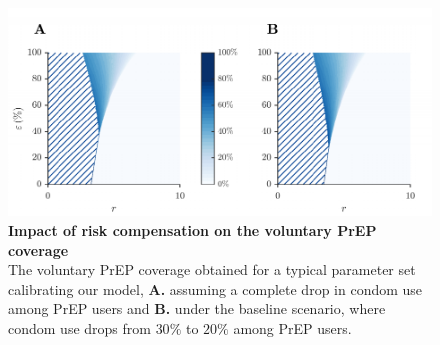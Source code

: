 \documentclass[12pt]{article}
\begin{document}
\newpage
\begin{figure}[H]
	\centering	
	\includegraphics{Figures/Fig_S5}
	\caption[Impact of risk compensation on the voluntary PrEP coverage]{%
		\textbf{Impact of risk compensation on the voluntary PrEP coverage}\\
	The voluntary PrEP coverage obtained for a typical parameter set calibrating our model, \textbf{A.} assuming a complete drop in condom use among PrEP users and \textbf{B.} under the baseline scenario, where condom use drops from $30\%$ to $20\%$ among PrEP users.}
	\label{fig:p_hat_CondomDrop}
\end{figure}


\newpage
\renewcommand{\refname}{\section{References}}
\setlength{\labelsep}{1.5em}

 
\end{document}
